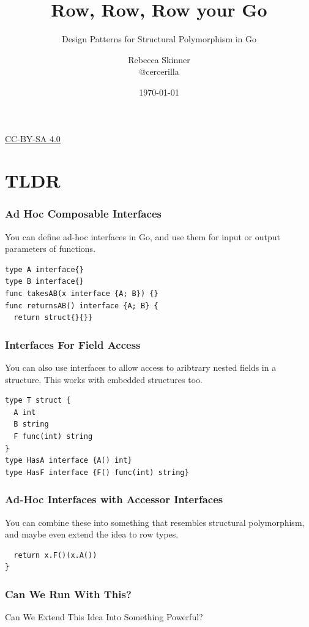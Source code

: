 \documentclass{beamer}
\title{Row, Row, Row your Go}
\subtitle{Design Patterns for Structural Polymorphism in Go}
\author{Rebecca Skinner\\ \small{@cercerilla}}
\date{\today}
\newcommand{\hugecenter}[1]{\begin{center}\begin{huge}#1\end{huge}\end{center}}
\newcommand{\chref}[3] {
  {\color{#1} \href{#2}{\underline{#3}}}
}
\begin{document}
\begin{frame}
  \titlepage{}
\end{frame}
\begin{frame}
  \begin{center}
    \small{\chref{blue}{http://creativecommons.org/licenses/by-sa/4.0/}{CC-BY-SA 4.0}}
  \end{center}
\end{frame}

\section{TLDR}
\begin{frame}[fragile]
  \frametitle{Ad Hoc Composable Interfaces}
  You can define ad-hoc interfaces in Go, and use them for input or
  output parameters of functions.
  \pause
\begin{lstlisting}[language=Golang]
type A interface{}
type B interface{}
func takesAB(x interface {A; B}) {}
func returnsAB() interface {A; B} {
  return struct{}{}}
\end{lstlisting}
\end{frame}

\begin{frame}[fragile]
  \frametitle{Interfaces For Field Access}
  You can also use interfaces to allow access to aribtrary nested
  fields in a structure.  This works with embedded structures too.
  \pause
\begin{lstlisting}[language=Golang]
type T struct {
  A int
  B string
  F func(int) string
}
type HasA interface {A() int}
type HasF interface {F() func(int) string}
\end{lstlisting}
\end{frame}

\begin{frame}[fragile]
  \frametitle{Ad-Hoc Interfaces with Accessor Interfaces}
  You can combine these into something that resembles structural
  polymorphism, and maybe even extend the idea to row types.
  \pause
\begin{lstlisting}[language=Golang]
% func callF(x interface {HasA; HasF}) string {
  return x.F()(x.A())
}
\end{lstlisting}
\end{frame}

\begin{frame}
  \frametitle{Can We Run With This?}
  \hugecenter{Can We Extend This Idea Into Something Powerful?}
\end{frame}
\end{document}
